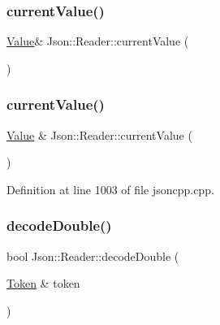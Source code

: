 \hypertarget{class_json_1_1_reader_a1cab5c0f13de764be705d636701ffbad}{}\label{class_json_1_1_reader_a1cab5c0f13de764be705d636701ffbad} 
\subsubsection{\texorpdfstring{current\+Value()}{currentValue()}\hspace{0.1cm}{\footnotesize\ttfamily [1/2]}}
{\footnotesize\ttfamily \hyperlink{class_json_1_1_value}{Value}\& Json\+::\+Reader\+::current\+Value (\begin{DoxyParamCaption}{ }\end{DoxyParamCaption})\hspace{0.3cm}{\ttfamily [private]}}

\hypertarget{class_json_1_1_reader_a85597f763fb0148a17359b6dfc6f7326}{}\label{class_json_1_1_reader_a85597f763fb0148a17359b6dfc6f7326} 
\subsubsection{\texorpdfstring{current\+Value()}{currentValue()}\hspace{0.1cm}{\footnotesize\ttfamily [2/2]}}
{\footnotesize\ttfamily \hyperlink{class_json_1_1_value}{Value} \& Json\+::\+Reader\+::current\+Value (\begin{DoxyParamCaption}{ }\end{DoxyParamCaption})\hspace{0.3cm}{\ttfamily [private]}}



Definition at line 1003 of file jsoncpp.\+cpp.

\hypertarget{class_json_1_1_reader_a2420bbb7fd6d5d3e7e2fea894dd8f70f}{}\label{class_json_1_1_reader_a2420bbb7fd6d5d3e7e2fea894dd8f70f} 
\subsubsection{\texorpdfstring{decode\+Double()}{decodeDouble()}\hspace{0.1cm}{\footnotesize\ttfamily [1/4]}}
{\footnotesize\ttfamily bool Json\+::\+Reader\+::decode\+Double (\begin{DoxyParamCaption}\item[{\hyperlink{class_json_1_1_reader_1_1_token}{Token} \&}]{token }\end{DoxyParamCaption})\hspace{0.3cm}{\ttfamily [private]}}

